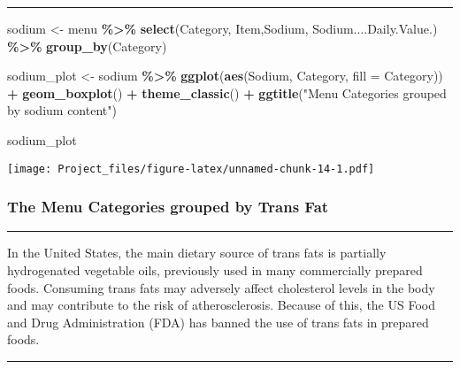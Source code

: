 \documentclass[
]{article}
\newenvironment{Shaded}{\begin{snugshade}}{\end{snugshade}}
\newcommand{\AttributeTok}[1]{\textcolor[rgb]{0.13,0.29,0.53}{#1}}
\newcommand{\FunctionTok}[1]{\textcolor[rgb]{0.13,0.29,0.53}{\textbf{#1}}}
\newcommand{\NormalTok}[1]{#1}
\newcommand{\OtherTok}[1]{\textcolor[rgb]{0.56,0.35,0.01}{#1}}
\newcommand{\SpecialCharTok}[1]{\textcolor[rgb]{0.81,0.36,0.00}{\textbf{#1}}}
\newcommand{\StringTok}[1]{\textcolor[rgb]{0.31,0.60,0.02}{#1}}
\begin{document}
\begin{center}\rule{0.5\linewidth}{0.5pt}\end{center}

\begin{Shaded}
\begin{Highlighting}[]
\NormalTok{sodium  }\OtherTok{\textless{}{-}}\NormalTok{ menu }\SpecialCharTok{\%\textgreater{}\%}
  \FunctionTok{select}\NormalTok{(Category,}
\NormalTok{         Item,Sodium,}
\NormalTok{         Sodium....Daily.Value.) }\SpecialCharTok{\%\textgreater{}\%} 
  \FunctionTok{group\_by}\NormalTok{(Category)}


\NormalTok{sodium\_plot }\OtherTok{\textless{}{-}}\NormalTok{ sodium }\SpecialCharTok{\%\textgreater{}\%} 
  \FunctionTok{ggplot}\NormalTok{(}\FunctionTok{aes}\NormalTok{(Sodium,}
\NormalTok{             Category,}
             \AttributeTok{fill =}\NormalTok{ Category)) }\SpecialCharTok{+}
  \FunctionTok{geom\_boxplot}\NormalTok{() }\SpecialCharTok{+} \FunctionTok{theme\_classic}\NormalTok{() }\SpecialCharTok{+} \FunctionTok{ggtitle}\NormalTok{(}\StringTok{"Menu Categories grouped by sodium content"}\NormalTok{)}


\NormalTok{sodium\_plot}
\end{Highlighting}
\end{Shaded}

\texttt{[image: Project\_files/figure-latex/unnamed-chunk-14-1.pdf]}

\hypertarget{the-menu-categories-grouped-by-trans-fat}{%
\subsubsection{The Menu Categories grouped by Trans
Fat}\label{the-menu-categories-grouped-by-trans-fat}}

\begin{center}\rule{0.5\linewidth}{0.5pt}\end{center}

In the United States, the main dietary source of trans fats is partially
hydrogenated vegetable oils, previously used in many commercially
prepared foods. Consuming trans fats may adversely affect cholesterol
levels in the body and may contribute to the risk of atherosclerosis.
Because of this, the US Food and Drug Administration (FDA) has banned
the use of trans fats in prepared foods.

\begin{center}\rule{0.5\linewidth}{0.5pt}\end{center}
\end{document}
